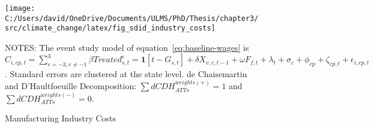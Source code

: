 \begin{figure}[H]
    \centering
    \texttt{[image: C:/Users/david/OneDrive/Documents/ULMS/PhD/Thesis/chapter3/src/climate\_change/latex/fig\_sdid\_industry\_costs]}
    \caption{Manufacturing Industry Costs}
    \label{fig:baseline-manufacturing-industry-costs}
    \begin{minipage}{\columnwidth}
        \vspace{0.05in}
        \tiny NOTES: The event study model of equation~\ref{eq:baseline-wages} is $C_{i,cp,t} = \sum_{{e = -3},{e \neq -1}}^{3} \beta Treated_{s,t}^e = \textbf{1}[t - G_{s,t}] + \delta X_{v,c,t-1} + \omega F_{f,t} + \lambda_{t} + \sigma_{c} + \phi_{cp} + \zeta_{cp,t} + \epsilon_{i,cp,t}$. Standard errors are clustered at the state level. de Chaisemartin and D'Haultfoeuille Decomposition: $\sum dCDH_{ATTs}^{weights(+)} = 1$ and $\sum dCDH_{ATTs}^{weights(-)} = 0$.
    \end{minipage}
\end{figure}